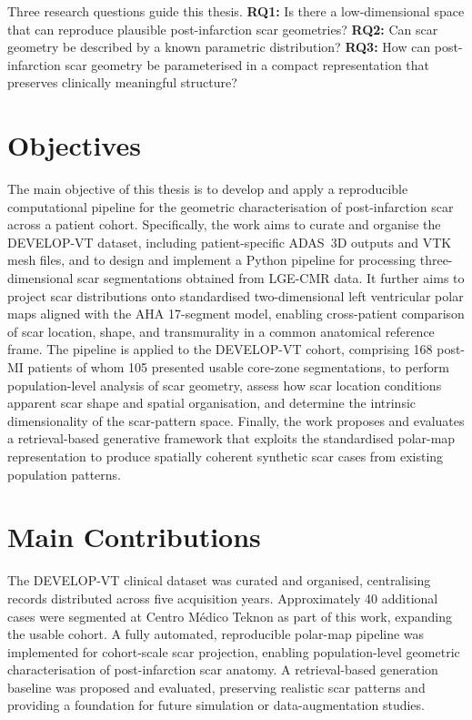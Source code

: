 Three research questions guide this thesis. \textbf{RQ1:} Is there a low-dimensional space
that can reproduce plausible post-infarction scar geometries? \textbf{RQ2:} Can scar
geometry be described by a known parametric distribution? \textbf{RQ3:} How can
post-infarction scar geometry be parameterised in a compact representation that preserves
clinically meaningful structure?

\section*{Objectives}

The main objective of this thesis is to develop and apply a reproducible computational
pipeline for the geometric characterisation of post-infarction scar across a patient cohort.
Specifically, the work aims to curate and organise the DEVELOP-VT dataset, including
patient-specific ADAS~3D outputs and VTK mesh files, and to design and implement a
Python pipeline for processing three-dimensional scar segmentations obtained from
LGE-CMR data. It further aims to project scar distributions onto standardised
two-dimensional left ventricular polar maps aligned with the AHA 17-segment model,
enabling cross-patient comparison of scar location, shape, and transmurality in a common
anatomical reference frame. The pipeline is applied to the DEVELOP-VT cohort, comprising
168 post-MI patients of whom 105 presented usable core-zone segmentations, to perform
population-level analysis of scar geometry, assess how scar location conditions apparent
scar shape and spatial organisation, and determine the intrinsic dimensionality of the
scar-pattern space. Finally, the work proposes and evaluates a retrieval-based generative
framework that exploits the standardised polar-map representation to produce spatially
coherent synthetic scar cases from existing population patterns.

\section*{Main Contributions}

The DEVELOP-VT clinical dataset was curated and organised, centralising records
distributed across five acquisition years. Approximately 40 additional cases were
segmented at Centro M\'{e}dico Teknon as part of this work, expanding the usable cohort.
A fully automated, reproducible polar-map pipeline was implemented for cohort-scale scar
projection, enabling population-level geometric characterisation of post-infarction scar
anatomy. A retrieval-based generation baseline was proposed and evaluated, preserving
realistic scar patterns and providing a foundation for future simulation or data-augmentation
studies.
